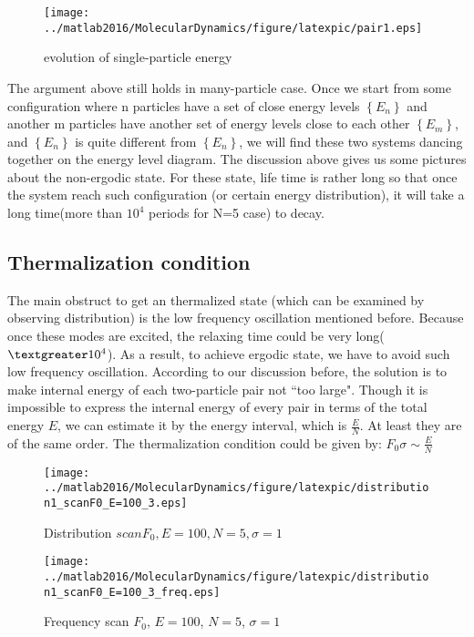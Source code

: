\documentclass[a4paper,onecolumn,12pt]{article}
\begin{document}
\begin{figure}[hbtp]
\centering
\texttt{[image: ../matlab2016/MolecularDynamics/figure/latexpic/pair1.eps]}
\caption{evolution of single-particle energy}
\label{fig:thermalization4}
\end{figure}

The argument above still holds in many-particle case. Once we start from some configuration where n particles have a set of close energy levels $\left\lbrace E_n\right\rbrace $ and another m particles have another set of energy levels close to each other $\left\lbrace E_m\right\rbrace $, and $\left\lbrace E_n\right\rbrace $ is quite different from $\left\lbrace E_n\right\rbrace $, we will find these two systems dancing together on the energy level diagram. 
The discussion above gives us some pictures about the non-ergodic state. For these state, life time is rather long so that once the system reach such configuration (or certain energy distribution), it will take a long time(more than $10^4$ periods for N=5 case) to decay. 

\subsection{Thermalization condition}
The main obstruct to get an thermalized state (which can be examined by observing distribution) is the low frequency oscillation mentioned before. Because once these modes are excited, the relaxing time could be very long($\textgreater 10^4$). As a result, to achieve ergodic state, we have to avoid such low frequency oscillation. According to our discussion before, the solution is to make internal energy of each two-particle pair not ``too large". Though it is impossible to express the internal energy of every pair in terms of the total energy $E$, we can estimate it by the energy interval, which is $\frac{E}{N}$. At least they are of the same order. The thermalization condition could be given by:
$F_0\sigma\sim\frac{E}{N}$


\begin{figure}[hbtp]
\centering
\texttt{[image: ../matlab2016/MolecularDynamics/figure/latexpic/distribution1\_scanF0\_E=100\_3.eps]}
\caption{Distribution $scan F_0, E=100, N=5, \sigma=1$}
\label{fig:thermalization5}
\texttt{[image: ../matlab2016/MolecularDynamics/figure/latexpic/distribution1\_scanF0\_E=100\_3\_freq.eps]}
\caption{Frequency scan $F_0$, $E=100$, $N=5$, $\sigma=1$}

\end{figure}
\end{document}
